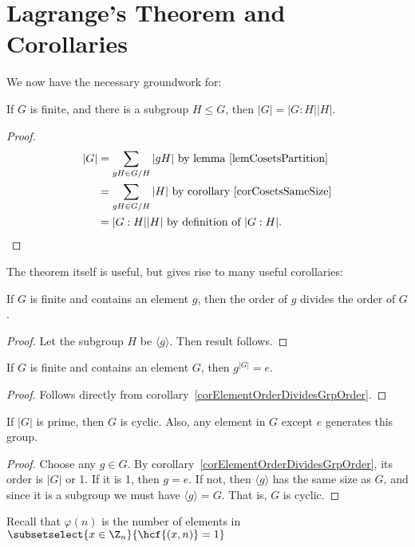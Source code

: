 \documentclass[../Main.tex]{subfiles}
\begin{document}
\section{Lagrange's Theorem and Corollaries}
We now have the necessary groundwork for:
\begin{theorem}
    If $G$ is finite, and there is a subgroup $H \leq G$, then $|G| = |G : H| |H|$.
    \label{thmLagrange}
\end{theorem}
\begin{proof}
    \begin{align*}
        |G| &= \sum_{gH \in G / H} |gH| \text{ by lemma~\ref{lemCosetsPartition}} \\
        &= \sum_{gH \in G / H} |H| \text{ by corollary~\ref{corCosetsSameSize}} \\
        &= |G : H| |H| \text{ by definition of } |G : H|.
    \end{align*}
\end{proof}
The theorem itself is useful, but gives rise to many useful corollaries:
\begin{corollary}
    If $G$ is finite and contains an element $g$, then the order of $g$ divides the order of $G$.
    \label{corElementOrderDividesGrpOrder}
\end{corollary}
\begin{proof}
    Let the subgroup $H$ be $\langle g \rangle$. Then result follows.
\end{proof}
\begin{corollary}
    If $G$ is finite and contains an element $G$, then $g^{|G|} = e$.
    \label{corGroupOrderExponent}
\end{corollary}
\begin{proof}
    Follows directly from corollary~\ref{corElementOrderDividesGrpOrder}.
\end{proof}
\begin{corollary}
    If $|G|$ is prime, then $G$ is cyclic. Also, any element in $G$ except $e$ generates this group.
    \label{corPrimeGroupCyclic}
\end{corollary}
\begin{proof}
    Choose any $g \in G$. By corollary~\ref{corElementOrderDividesGrpOrder}, its order is $|G|$ or 1. If it is 1, then $g = e$. If not, then $\langle g \rangle$ has the same size as $G$, and since it is a subgroup we must have $\langle g \rangle = G$. That is, $G$ is cyclic.
\end{proof}
Recall that $\varphi(n)$ is the number of elements in $\subsetselect{x \in \Z_n}{\hcf{(x, n)} = 1}$\par
\end{document}
